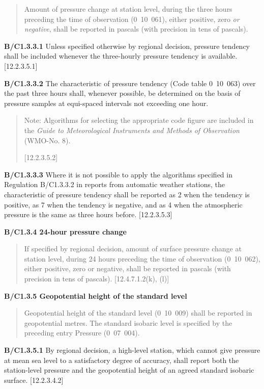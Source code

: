 \begin{quote}
Amount of pressure change at station level, during the three hours preceding the time of observation (0~10~061), either positive, zero \emph{or negative}, shall be reported in pascals (with precision in tens of pascals).
\end{quote}

\textbf{B/C1.3.3.1} Unless specified otherwise by regional decision, pressure tendency shall be included whenever the three-hourly pressure tendency is available. {[}12.2.3.5.1{]}

\textbf{B/C1.3.3.2} The characteristic of pressure tendency (Code table 0~10~063) over the past three hours shall, whenever possible, be determined on the basis of pressure samples at equi-spaced intervals not exceeding one hour.

\begin{quote}
Note: Algorithms for selecting the appropriate code figure are included in the \emph{Guide to Meteorological Instruments and Methods of Observation} (WMO-No. 8).

{[}12.2.3.5.2{]}
\end{quote}

\textbf{B/C1.3.3.3} Where it is not possible to apply the algorithms specified in Regulation B/C1.3.3.2 in reports from automatic weather stations, the characteristic of pressure tendency shall be reported as 2 when the tendency is positive, as 7 when the tendency is negative, and as 4 when the atmospheric pressure is the same as three hours before. {[}12.2.3.5.3{]}

\textbf{B/C1.3.4 24-hour pressure change}

\begin{quote}
If specified by regional decision, amount of surface pressure change at station level, during 24 hours preceding the time of observation (0~10~062), either positive, zero or negative, shall be reported in pascals (with precision in tens of pascals). {[}12.4.7.1.2(k), (l){]}
\end{quote}

\textbf{B/C1.3.5 Geopotential height of the standard level}

\begin{quote}
Geopotential height of the standard level (0~10~009) shall be reported in geopotential metres. The standard isobaric level is specified by the preceding entry Pressure (0~07~004).
\end{quote}

\textbf{B/C1.3.5.1} By regional decision, a high-level station, which cannot give pressure at mean sea level to a satisfactory degree of accuracy, shall report both the station-level pressure and the geopotential height of an agreed standard isobaric surface. {[}12.2.3.4.2{]}

